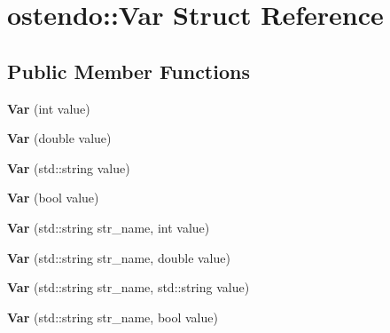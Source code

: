 \hypertarget{structostendo_1_1Var}{}\section{ostendo\+:\+:Var Struct Reference}
\label{structostendo_1_1Var}
\subsection*{Public Member Functions}
\begin{DoxyCompactItemize}
\item 
\mbox{\label{structostendo_1_1Var_a271aecf1954157dc34985a7a2ef506b9}} 
{\bfseries Var} (int value)
\item 
\mbox{\label{structostendo_1_1Var_a77cedab74802b291425fddee5465df39}} 
{\bfseries Var} (double value)
\item 
\mbox{\label{structostendo_1_1Var_a6af5058ed312a3860389b3a15947aacd}} 
{\bfseries Var} (std\+::string value)
\item 
\mbox{\label{structostendo_1_1Var_a1c3bc2ea850b6748989a70f82f73c62a}} 
{\bfseries Var} (bool value)
\item 
\mbox{\label{structostendo_1_1Var_a54737db1fa6cd70f182ad2a7b1904f7d}} 
{\bfseries Var} (std\+::string str\+\_\+name, int value)
\item 
\mbox{\label{structostendo_1_1Var_a12e2c20b81280d34d13a77b39c57f96d}} 
{\bfseries Var} (std\+::string str\+\_\+name, double value)
\item 
\mbox{\label{structostendo_1_1Var_aa80859e63a7df5c1beab958e621637b8}} 
{\bfseries Var} (std\+::string str\+\_\+name, std\+::string value)
\item 
\mbox{\label{structostendo_1_1Var_a2a1b2e8999f04386e78330662734fc52}} 
{\bfseries Var} (std\+::string str\+\_\+name, bool value)
\item 
\mbox{\label{structostendo_1_1Var_add66e15a270e6dc6dbdc81e707ebae2a}} 

\end{DoxyCompactItemize}
